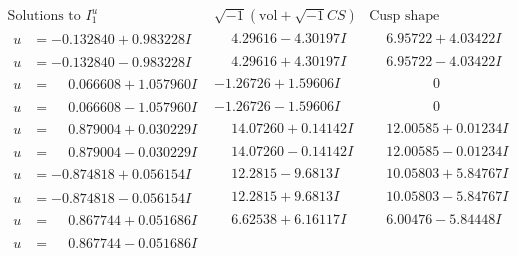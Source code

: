 \documentclass[1p]{elsarticle_modified}
\theoremstyle{definition}
\newcommand{\I}{\sqrt{-1}}
\begin{document}
$$\begin{array}{c|c|c}  
\text{Solutions to }I^u_{1}& \I (\text{vol} + \sqrt{-1}CS) & \text{Cusp shape}\\
 \hline 
\begin{aligned}
u &= -0.132840 + 0.983228 I\end{aligned}
 & \phantom{-}4.29616 - 4.30197 I & \phantom{-}6.95722 + 4.03422 I \\ \hline\begin{aligned}
u &= -0.132840 - 0.983228 I\end{aligned}
 & \phantom{-}4.29616 + 4.30197 I & \phantom{-}6.95722 - 4.03422 I \\ \hline\begin{aligned}
u &= \phantom{-}0.066608 + 1.057960 I\end{aligned}
 & -1.26726 + 1.59606 I & \phantom{-0.000000 } 0 \\ \hline\begin{aligned}
u &= \phantom{-}0.066608 - 1.057960 I\end{aligned}
 & -1.26726 - 1.59606 I & \phantom{-0.000000 } 0 \\ \hline\begin{aligned}
u &= \phantom{-}0.879004 + 0.030229 I\end{aligned}
 & \phantom{-}14.07260 + 0.14142 I & \phantom{-}12.00585 + 0.01234 I \\ \hline\begin{aligned}
u &= \phantom{-}0.879004 - 0.030229 I\end{aligned}
 & \phantom{-}14.07260 - 0.14142 I & \phantom{-}12.00585 - 0.01234 I \\ \hline\begin{aligned}
u &= -0.874818 + 0.056154 I\end{aligned}
 & \phantom{-}12.2815 - 9.6813 I & \phantom{-}10.05803 + 5.84767 I \\ \hline\begin{aligned}
u &= -0.874818 - 0.056154 I\end{aligned}
 & \phantom{-}12.2815 + 9.6813 I & \phantom{-}10.05803 - 5.84767 I \\ \hline\begin{aligned}
u &= \phantom{-}0.867744 + 0.051686 I\end{aligned}
 & \phantom{-}6.62538 + 6.16117 I & \phantom{-}6.00476 - 5.84448 I \\ \hline\begin{aligned}
u &= \phantom{-}0.867744 - 0.051686 I\end{aligned}

\end{array}$$
\end{document}
